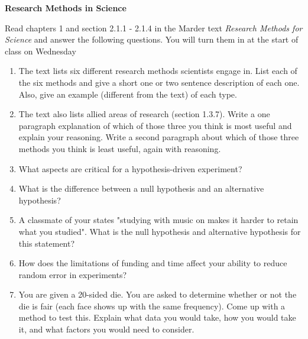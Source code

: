 \documentclass[12pt, letterpaper]{article}
\begin{document}
\textbf{\Large Research Methods in Science}

Read chapters 1 and section 2.1.1 - 2.1.4 in the Marder text \emph{Research Methods for Science} and answer the following questions.  You will turn them in at the start of class on Wednesday

\begin{enumerate}

\item The text lists six different research methods scientists engage in.  List each of the six methods and give a short one or two sentence description of each one.  Also, give an example (different from the text) of each type.

\item The text also lists allied areas of research (section 1.3.7).  Write a one paragraph explanation of which of those three you think is most useful and explain your reasoning.  Write a second paragraph about which of those three methods you think is least useful, again with reasoning.

\item What aspects are critical for a hypothesis-driven experiment?

\item What is the difference between a null hypothesis and an alternative hypothesis?

\item A classmate of your states "studying with music on makes it harder to retain what you studied".  What is the null hypothesis and alternative hypothesis for this statement?

\item How does the limitations of funding and time affect your ability to reduce random error in experiments?

\item You are given a 20-sided die.  You are asked to determine whether or not the die is fair (each face shows up with the same frequency).  Come up with a method to test this.  Explain what data you would take, how you would take it, and what factors you would need to consider.

\end{enumerate}
\end{document}
